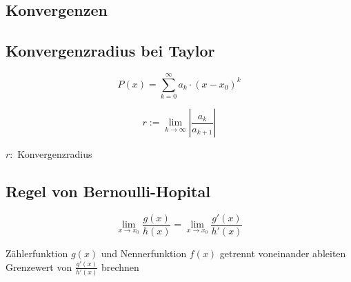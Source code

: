 \begin{multicols*}{3}
    \WhiteSpace
    \section{Konvergenzen}
    \subsection{Konvergenzradius bei Taylor}

    $$P(x) = \sum_{k = 0}^{ \infty }a_k\cdot(x-x_0)^k$$

    {$$r:= \lim_{k \to \infty } |\frac{a_k}{a_{k+1}}| $$} 

    {$r:$ Konvergenzradius}
    \subsection{Regel von Bernoulli-Hopital}
  

    $$ \lim_{x \to x_0} \frac{g(x)}{h(x)} = \lim_{x \to x_0} \frac{g'(x)}{h'(x)}$$

    { Zählerfunktion $g(x)$ und Nennerfunktion $f(x)$ getrennt voneinander ableiten}
    \WhiteSpace
    { Grenzewert von $\frac{g'(x)}{h'(x)}$ brechnen}
    \WhiteSpace

    \mbox{}

\end{multicols*}


